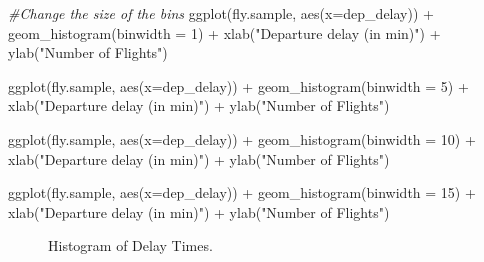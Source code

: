 \documentclass[
]{book}
\newenvironment{Shaded}{\begin{snugshade}}{\end{snugshade}}
\newcommand{\AttributeTok}[1]{\textcolor[rgb]{0.77,0.63,0.00}{#1}}
\newcommand{\CommentTok}[1]{\textcolor[rgb]{0.56,0.35,0.01}{\textit{#1}}}
\newcommand{\DecValTok}[1]{\textcolor[rgb]{0.00,0.00,0.81}{#1}}
\newcommand{\FunctionTok}[1]{\textcolor[rgb]{0.00,0.00,0.00}{#1}}
\newcommand{\NormalTok}[1]{#1}
\newcommand{\SpecialCharTok}[1]{\textcolor[rgb]{0.00,0.00,0.00}{#1}}
\newcommand{\StringTok}[1]{\textcolor[rgb]{0.31,0.60,0.02}{#1}}
\begin{document}
\begin{Shaded}
\begin{Highlighting}[]
\CommentTok{\#Change the size of the bins}
\FunctionTok{ggplot}\NormalTok{(fly.sample, }\FunctionTok{aes}\NormalTok{(}\AttributeTok{x=}\NormalTok{dep\_delay)) }\SpecialCharTok{+} \FunctionTok{geom\_histogram}\NormalTok{(}\AttributeTok{binwidth =} \DecValTok{1}\NormalTok{)  }\SpecialCharTok{+}
  \FunctionTok{xlab}\NormalTok{(}\StringTok{"Departure delay (in min)"}\NormalTok{) }\SpecialCharTok{+} \FunctionTok{ylab}\NormalTok{(}\StringTok{"Number of Flights"}\NormalTok{)}

\FunctionTok{ggplot}\NormalTok{(fly.sample, }\FunctionTok{aes}\NormalTok{(}\AttributeTok{x=}\NormalTok{dep\_delay)) }\SpecialCharTok{+} \FunctionTok{geom\_histogram}\NormalTok{(}\AttributeTok{binwidth =} \DecValTok{5}\NormalTok{)  }\SpecialCharTok{+}
  \FunctionTok{xlab}\NormalTok{(}\StringTok{"Departure delay (in min)"}\NormalTok{) }\SpecialCharTok{+} \FunctionTok{ylab}\NormalTok{(}\StringTok{"Number of Flights"}\NormalTok{)}

\FunctionTok{ggplot}\NormalTok{(fly.sample, }\FunctionTok{aes}\NormalTok{(}\AttributeTok{x=}\NormalTok{dep\_delay)) }\SpecialCharTok{+} \FunctionTok{geom\_histogram}\NormalTok{(}\AttributeTok{binwidth =} \DecValTok{10}\NormalTok{) }\SpecialCharTok{+}
  \FunctionTok{xlab}\NormalTok{(}\StringTok{"Departure delay (in min)"}\NormalTok{) }\SpecialCharTok{+} \FunctionTok{ylab}\NormalTok{(}\StringTok{"Number of Flights"}\NormalTok{)}

\FunctionTok{ggplot}\NormalTok{(fly.sample, }\FunctionTok{aes}\NormalTok{(}\AttributeTok{x=}\NormalTok{dep\_delay)) }\SpecialCharTok{+} \FunctionTok{geom\_histogram}\NormalTok{(}\AttributeTok{binwidth =} \DecValTok{15}\NormalTok{) }\SpecialCharTok{+}
  \FunctionTok{xlab}\NormalTok{(}\StringTok{"Departure delay (in min)"}\NormalTok{) }\SpecialCharTok{+} \FunctionTok{ylab}\NormalTok{(}\StringTok{"Number of Flights"}\NormalTok{)}
\end{Highlighting}
\end{Shaded}

\begin{figure}

{\centering {}\newline{}

}

\caption{Histogram of Delay Times.}\label{fig:chunk-label7}
\end{figure}
\end{document}
